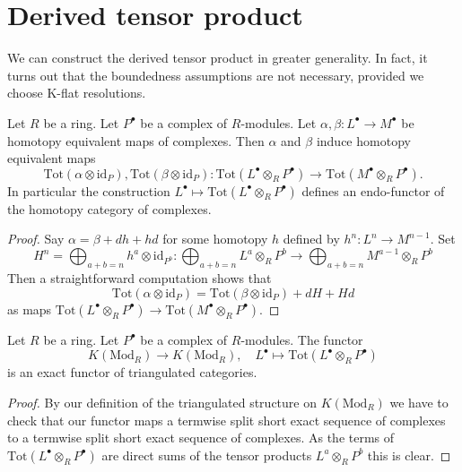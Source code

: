 \section{Derived tensor product}
\label{section-derived-tensor-product}

\noindent
We can construct the derived tensor product in greater generality.
In fact, it turns out that the boundedness assumptions are not
necessary, provided we choose K-flat resolutions.

\begin{lemma}
\label{lemma-derived-tor-homotopy}
Let $R$ be a ring.
Let $P^\bullet$ be a complex of $R$-modules.
Let $\alpha, \beta : L^\bullet \to M^\bullet$ be homotopy equivalent
maps of complexes. Then $\alpha$ and $\beta$ induce homotopy equivalent
maps
$$
\text{Tot}(\alpha \otimes \text{id}_P),
\text{Tot}(\beta \otimes \text{id}_P) :
\text{Tot}(L^\bullet \otimes_R P^\bullet)
\longrightarrow
\text{Tot}(M^\bullet \otimes_R P^\bullet).
$$
In particular the construction
$L^\bullet \mapsto \text{Tot}(L^\bullet \otimes_R P^\bullet)$
defines an endo-functor of the homotopy category of complexes.
\end{lemma}

\begin{proof}
Say $\alpha = \beta + dh + hd$ for some homotopy $h$ defined by
$h^n : L^n \to M^{n - 1}$. Set
$$
H^n = \bigoplus\nolimits_{a + b = n} h^a \otimes \text{id}_{P^b} :
\bigoplus\nolimits_{a + b = n} L^a \otimes_R P^b
\longrightarrow
\bigoplus\nolimits_{a + b = n} M^{a - 1} \otimes_R P^b
$$
Then a straightforward computation shows that
$$
\text{Tot}(\alpha \otimes \text{id}_P) =
\text{Tot}(\beta \otimes \text{id}_P) + dH + Hd
$$
as maps $\text{Tot}(L^\bullet \otimes_R P^\bullet) \to
\text{Tot}(M^\bullet \otimes_R P^\bullet)$.
\end{proof}

\begin{lemma}
\label{lemma-derived-tor-exact}
Let $R$ be a ring.
Let $P^\bullet$ be a complex of $R$-modules.
The functor
$$
K(\text{Mod}_R) \longrightarrow K(\text{Mod}_R), \quad
L^\bullet \longmapsto \text{Tot}(L^\bullet \otimes_R P^\bullet)
$$
is an exact functor of triangulated categories.
\end{lemma}

\begin{proof}
By our definition of the triangulated structure on
$K(\text{Mod}_R)$ we have to check that our functor maps
a termwise split short exact sequence of complexes to a termwise
split short exact sequence of complexes. As the terms of
$\text{Tot}(L^\bullet \otimes_R P^\bullet)$ are direct sums
of the tensor products $L^a \otimes_R P^b$ this is clear.
\end{proof}

